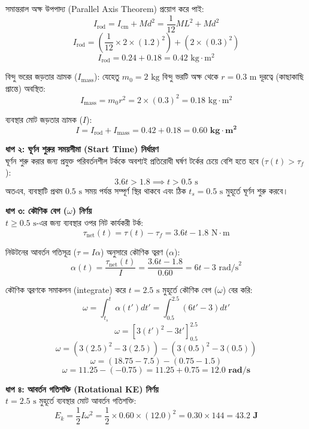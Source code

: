 \documentclass[12pt, a4paper]{article}
\begin{document}
\begin{tcolorbox}[solutionbox={সমাধান (Solution)}]
\begin{center}
\begin{tikzpicture}[>=Stealth, scale=1.4, text=black]
\end{tikzpicture}
\end{center}
\vspace{1em}

সমান্তরাল অক্ষ উপপাদ্য (Parallel Axis Theorem) প্রয়োগ করে পাই:
$$I_{\text{rod}} = I_{\text{cm}} + M d^2 = \frac{1}{12} M L^2 + M d^2$$ 
$$I_{\text{rod}} = \left( \frac{1}{12} \times 2 \times (1.2)^2 \right) + \left( 2 \times (0.3)^2 \right)$$ 
$$I_{\text{rod}} = 0.24 + 0.18 = 0.42\text{ kg}\cdot\text{m}^2$$

বিন্দু ভরের জড়তার ভ্রামক ($I_{\text{mass}}$): যেহেতু $m_0 = 2\text{ kg}$ বিন্দু ভরটি অক্ষ থেকে $r = 0.3\text{ m}$ দূরত্বে (কাছাকাছি প্রান্তে) অবস্থিত:
$$I_{\text{mass}} = m_0 r^2 = 2 \times (0.3)^2 = 0.18\text{ kg}\cdot\text{m}^2$$

ব্যবস্থার মোট জড়তার ভ্রামক ($I$):
$$I = I_{\text{rod}} + I_{\text{mass}} = 0.42 + 0.18 = \mathbf{0.60\text{ kg}\cdot\text{m}^2}$$

\vspace{0.5em}
\noindent
\textbf{ধাপ ২: ঘূর্ণন শুরুর সময়সীমা (Start Time) নির্ধারণ} \\
ঘূর্ণন শুরু করার জন্য প্রযুক্ত পরিবর্তনশীল টর্ককে অবশ্যই প্রতিরোধী ঘর্ষণ টর্কের চেয়ে বেশি হতে হবে ($\tau(t) > \tau_f$):
$$3.6 t > 1.8 \implies t > 0.5\text{ s}$$ 
অতএব, ব্যবস্থাটি প্রথম $0.5\text{ s}$ সময় পর্যন্ত সম্পূর্ণ স্থির থাকবে এবং ঠিক $t_s = 0.5\text{ s}$ মুহূর্তে ঘূর্ণন শুরু করবে।

\vspace{0.5em}
\noindent
\textbf{ধাপ ৩: কৌণিক বেগ ($\omega$) নির্ণয়} \\
$t \ge 0.5\text{ s}$-এর জন্য ব্যবস্থার ওপর নিট কার্যকরী টর্ক:
$$\tau_{\text{net}}(t) = \tau(t) - \tau_f = 3.6 t - 1.8\text{ N}\cdot\text{m}$$

নিউটনের আবর্তন গতিসূত্র ($\tau = I\alpha$) অনুসারে কৌণিক ত্বরণ ($\alpha$):
$$\alpha(t) = \frac{\tau_{\text{net}}(t)}{I} = \frac{3.6 t - 1.8}{0.60} = 6t - 3\text{ rad/s}^2$$

কৌণিক ত্বরণকে সমাকলন (integrate) করে $t = 2.5\text{ s}$ মুহূর্তে কৌণিক বেগ ($\omega$) বের করি:
$$\omega = \int_{t_s}^{t} \alpha(t') dt' = \int_{0.5}^{2.5} (6t' - 3) dt'$$ 
$$\omega = \left[ 3(t')^2 - 3t' \right]_{0.5}^{2.5}$$ 
$$\omega = \left( 3(2.5)^2 - 3(2.5) \right) - \left( 3(0.5)^2 - 3(0.5) \right)$$ 
$$\omega = (18.75 - 7.5) - (0.75 - 1.5)$$ 
$$\omega = 11.25 - (-0.75) = 11.25 + 0.75 = \mathbf{12.0\text{ rad/s}}$$

\vspace{0.5em}
\noindent
\textbf{ধাপ ৪: আবর্তন গতিশক্তি (Rotational KE) নির্ণয়} \\
$t = 2.5\text{ s}$ মুহূর্তে ব্যবস্থার মোট আবর্তন গতিশক্তি:
$$E_k = \frac{1}{2} I \omega^2 = \frac{1}{2} \times 0.60 \times (12.0)^2 = 0.30 \times 144 = \mathbf{43.2\text{ J}}$$


\end{tcolorbox}
\end{document}
